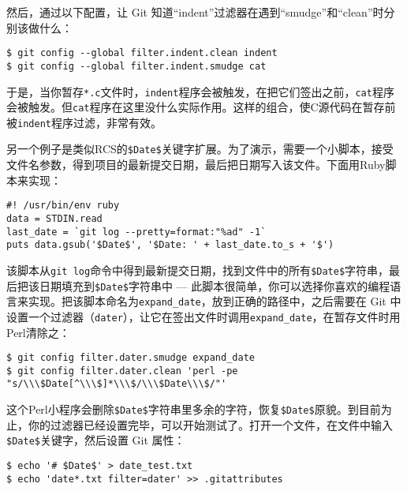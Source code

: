 \documentclass[a4paper]{book}
\begin{document}
然后，通过以下配置，让 Git 知道“indent”过滤器在遇到“smudge”和“clean”时分别该做什么：

\begin{shaded}\begin{verbatim}
$ git config --global filter.indent.clean indent
$ git config --global filter.indent.smudge cat
\end{verbatim}\end{shaded}

于是，当你暂存\texttt{*.c}文件时，\texttt{indent}程序会被触发，在把它们签出之前，\texttt{cat}程序会被触发。但\texttt{cat}程序在这里没什么实际作用。这样的组合，使C源代码在暂存前被\texttt{indent}程序过滤，非常有效。

另一个例子是类似RCS的\texttt{\$Date\$}关键字扩展。为了演示，需要一个小脚本，接受文件名参数，得到项目的最新提交日期，最后把日期写入该文件。下面用Ruby脚本来实现：

\begin{shaded}\begin{verbatim}
#! /usr/bin/env ruby
data = STDIN.read
last_date = `git log --pretty=format:"%ad" -1`
puts data.gsub('$Date$', '$Date: ' + last_date.to_s + '$')
\end{verbatim}\end{shaded}

该脚本从\texttt{git log}命令中得到最新提交日期，找到文件中的所有\texttt{\$Date\$}字符串，最后把该日期填充到\texttt{\$Date\$}字符串中 --- 此脚本很简单，你可以选择你喜欢的编程语言来实现。把该脚本命名为\texttt{expand\_date}，放到正确的路径中，之后需要在 Git 中设置一个过滤器（\texttt{dater}），让它在签出文件时调用\texttt{expand\_date}，在暂存文件时用Perl清除之：

\begin{shaded}\begin{verbatim}
$ git config filter.dater.smudge expand_date
$ git config filter.dater.clean 'perl -pe "s/\\\$Date[^\\\$]*\\\$/\\\$Date\\\$/"'
\end{verbatim}\end{shaded}

这个Perl小程序会删除\texttt{\$Date\$}字符串里多余的字符，恢复\texttt{\$Date\$}原貌。到目前为止，你的过滤器已经设置完毕，可以开始测试了。打开一个文件，在文件中输入\texttt{\$Date\$}关键字，然后设置 Git 属性：

\begin{shaded}\begin{verbatim}
$ echo '# $Date$' > date_test.txt
$ echo 'date*.txt filter=dater' >> .gitattributes
\end{verbatim}\end{shaded}
\end{document}
